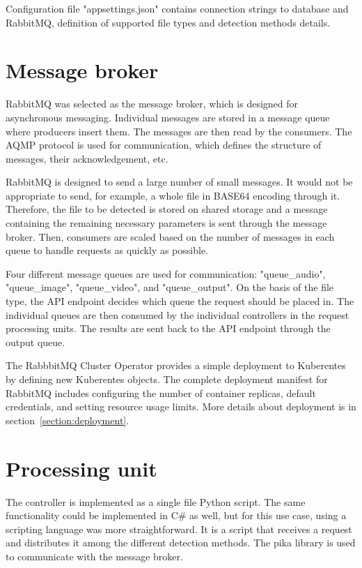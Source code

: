 Configuration file "appsettings.json" contains connection strings to database and RabbitMQ, definition of supported file types and detection methods details.

\section{Message broker}

RabbitMQ was selected as the message broker, which is designed for asynchronous messaging. Individual messages are stored in a message queue where producers insert them. The messages are then read by the consumers. The AQMP protocol is used for communication, which defines the structure of messages, their acknowledgement, etc.

RabbitMQ is designed to send a large number of small messages. It would not be appropriate to send, for example, a whole file in BASE64 encoding through it. Therefore, the file to be detected is stored on shared storage and a message containing the remaining necessary parameters is sent through the message broker. Then, consumers are scaled based on the number of messages in each queue to handle requests as quickly as possible.

Four different message queues are used for communication: "queue\_audio", "queue\_image", "queue\_video", and "queue\_output". On the basis of the file type, the API endpoint decides which queue the request should be placed in. The individual queues are then consumed by the individual controllers in the request processing units. The results are sent back to the API endpoint through the output queue.

The RabbbitMQ Cluster Operator provides a simple deployment to Kuberentes by defining new Kuberentes objects. The complete deployment manifest for RabbitMQ includes configuring the number of container replicas, default credentials, and setting resource usage limits. More details about deployment is in section~\ref{section:deployment}.

\section{Processing unit}

The controller is implemented as a single file Python script. The same functionality could be implemented in C\# as well, but for this use case, using a scripting language was more straightforward. It is a script that receives a request and distributes it among the different detection methods. The pika library is used to communicate with the message broker.

